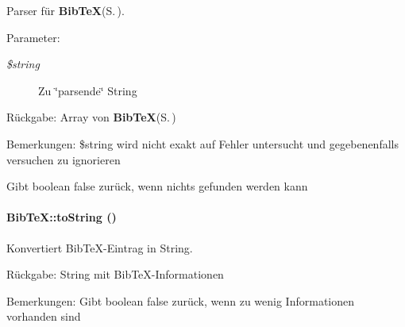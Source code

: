Parser für {\bf Bib\-Te\-X}{\rm (S.\,\pageref{classBibTeX})}. 

\begin{Desc}
\item[Parameter:]
\begin{description}
\item[{\em \$string}]Zu \char`\"{}parsende\char`\"{} String \end{description}
\end{Desc}
\begin{Desc}
\item[R\"{u}ckgabe:]Array von {\bf Bib\-Te\-X}{\rm (S.\,\pageref{classBibTeX})} \end{Desc}
\begin{Desc}
\item[Bemerkungen:]\$string wird nicht exakt auf Fehler untersucht und gegebenenfalls versuchen zu ignorieren 

Gibt boolean false zurück, wenn nichts gefunden werden kann \end{Desc}
\paragraph{\setlength{\rightskip}{0pt plus 5cm}Bib\-Te\-X::to\-String ()}\hfill\label{classBibTeX_e656009bd9e0ddf6cf4076d7d76fe94c}


Konvertiert Bib\-Te\-X-Eintrag in String. 

\begin{Desc}
\item[R\"{u}ckgabe:]String mit Bib\-Te\-X-Informationen \end{Desc}
\begin{Desc}
\item[Bemerkungen:]Gibt boolean false zurück, wenn zu wenig Informationen vorhanden sind \end{Desc}
